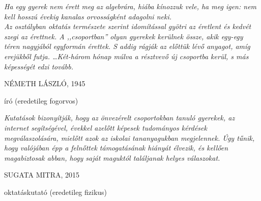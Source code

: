 \newlength\longest
\cleardoublepage
\thispagestyle{empty}
\null\vfill
{\centering
\parbox{0.8\textwidth} {%
    \raggedright{\large\itshape%
    Ha egy gyerek nem érett meg az algebrára, hiába kínozzuk vele,  
    ha meg igen: nem kell hosszú évekig kanalas orvosságként adagolni neki. \\
    Az osztályban oktatás természete szerint idomítással gyötri az éretlent 
    és kedvét szegi az érettnek. A ,,csoportban'' olyan gyerekek kerülnek össze, akik egy-egy téren 
    nagyjából egyformán érettek. S addig rágják az előttük lévő anyagot, amíg erejükből futja. \ldots Két-három hónap múlva a résztvevő új csoportba kerül, s más képességét edzi tovább.

        \par\bigskip
    }
    \raggedleft\Large\MakeUppercase{Németh László, 1945}\par%
    \raggedleft\normalsize{író (eredetileg fogorvos)}\par%
}\par%
}
\vfill\vfill
\bigskip
\null\vfill
{\centering
\parbox{0.8\textwidth} {%
    \raggedright{\large\itshape%
    Kutatások bizonyítják, hogy az önvezérelt csoportokban tanuló gyerekek, az internet segítségével, évekkel azelőtt képesek tudományos kérdések megválaszolására, mielőtt azok az iskolai tananyagukban megjelennek. Úgy tűnik, hogy valójában épp a felnőttek támogatásának hiányát élvezik, és kellően magabiztosak abban, hogy saját maguktól találjanak helyes válaszokat.

        \par\bigskip
    }
    \raggedleft\Large\MakeUppercase{Sugata Mitra, 2015}\par%
    \raggedleft\normalsize{oktatáskutató (eredetileg fizikus)}\par%
}\par%
}

\vfill\vfill
\clearpage

